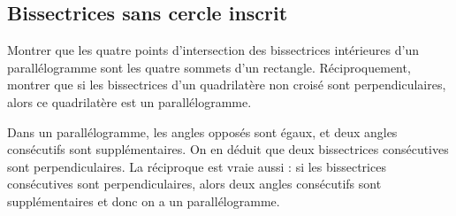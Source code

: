 \subsection{Bissectrices sans cercle inscrit}


\begin{exo}
Montrer que les quatre points d'intersection des bissectrices intérieures d'un parallélogramme sont les quatre sommets d'un rectangle. Réciproquement, montrer que si les bissectrices d'un quadrilatère non croisé sont perpendiculaires, alors ce quadrilatère est un parallélogramme.
\begin{sol}
Dans un parallélogramme, les angles opposés sont égaux, et deux angles consécutifs sont supplémentaires. On en déduit que deux bissectrices consécutives sont perpendiculaires. La réciproque est vraie aussi : si les bissectrices consécutives sont perpendiculaires, alors deux angles consécutifs sont supplémentaires et donc on a un parallélogramme.
\end{sol}
\end{exo}


